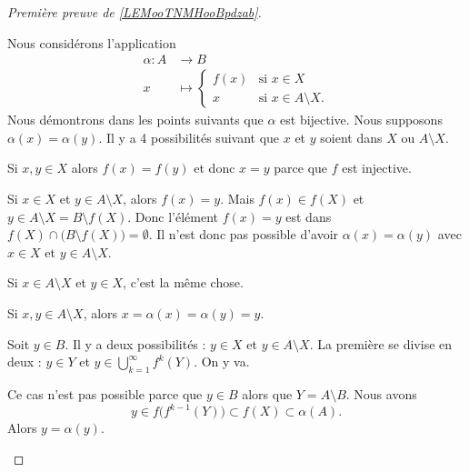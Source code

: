 \begin{proof}[Première preuve de \ref{LEMooTNMHooBpdzab}]
\begin{subproof}
		\spitem[La bijection]
		Nous considérons l'application
		\begin{equation}
			\begin{aligned}
				\alpha\colon A & \to B                                        \\
				x              & \mapsto \begin{cases}
					                         f(x) & \text{si } x\in X             \\
					                         x    & \text{si } x\in A\setminus X.
				                         \end{cases}
			\end{aligned}
		\end{equation}
		Nous démontrons dans les points suivants que \( \alpha\) est bijective.
		\spitem[Injective]
		Nous supposons \( \alpha(x)=\alpha(y)\). Il y a 4 possibilités suivant que \( x\) et \( y\) soient dans \( X\) ou \( A\setminus X\).

		Si \( x,y\in X\) alors \( f(x)=f(y)\) et donc \( x=y\) parce que \( f\) est injective.

		Si \( x\in X\) et \( y\in A\setminus X\), alors \( f(x)=y\). Mais \( f(x)\in f(X)\) et \( y\in A\setminus X=B\setminus f(X)\). Donc l'élément \( f(x)=y\) est dans \( f(X)\cap \big( B\setminus f(X) \big)=\emptyset\). Il n'est donc pas possible d'avoir \( \alpha(x)=\alpha(y)\) avec \( x\in X\) et \( y\in A\setminus X\).

		Si \( x\in A\setminus X\) et \( y\in X\), c'est la même chose.

		Si \( x,y\in A\setminus X\), alors \( x=\alpha(x)=\alpha(y)=y\).

		\spitem[Surjective]
		Soit \( y\in B\). Il y a deux possibilités : \( y\in X\) et \( y\in A\setminus X\). La première se divise en deux : \( y\in Y\) et \( y\in \bigcup_{k=1}^{\infty}f^k(Y)\). On y va.

		\begin{subproof}
			\spitem[\( y\in Y\)]
			Ce cas n'est pas possible parce que \( y\in B\) alors que \( Y=A\setminus B\).
			Nous avons
			\begin{equation}
				y\in f\big( f^{k-1}(Y) \big)\subset f(X)\subset \alpha(A).
			\end{equation}
			\spitem[\( y\in A\setminus X\)]
			Alors \( y=\alpha(y)\).
		\end{subproof}
	\end{subproof}
\end{proof}


